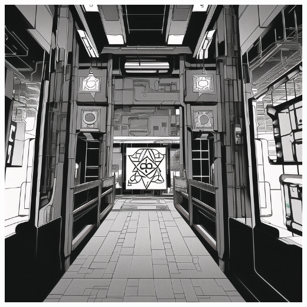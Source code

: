 \documentclass{article}
\begin{document}
	\newpage
	\includegraphics*[viewport = 100 0 628 768]{magic_cover.png}
	
	
	
	
	\newpage
	
	
	\newpage
	
	
	\newpage
	
	
	\newpage
	
	
	\newpage
	
\end{document}
